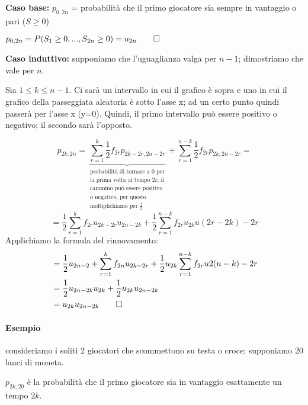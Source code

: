 \documentclass[a4paper,12pt]{book}
\begin{document}
\textbf{Caso base: } $ p_{0,2n} $ = probabilità che il primo giocatore sia sempre in vantaggio o pari ($ S \ge 0 $)

$ p_{0, 2n } = P(S_1 \ge 0, ..., S_{2n} \ge 0) = u_{2n} \qed$

\textbf{Caso induttivo: } supponiamo che l'uguaglianza valga per $ n-1 $; dimostriamo che vale per $ n $. 

Sia $ 1 \le k \le n-1 $. Ci sarà un intervallo in cui il grafico è sopra e uno in cui il grafico della passeggiata aleatoria è sotto l'asse x; ad un certo punto quindi passerà per l'asse x (y=0). Quindi, il primo intervallo può essere positivo o negativo; il secondo sarà l'opposto. 

$$ p_{2k, 2n} = \underbrace{\sum_{r=1}^{k}\frac{1}{2} f_{2r} p_{2k-2r, 2n-2r}}_{\substack{\text{probabilità di tornare a 0 per} \\ \text{la prima volta al tempo 2r; il} \\ \text{cammino può essere positivo} \\ \text{o negativo, per questo} \\ \text{moltiplichiamo per } \frac{1}{2}}}       + \sum_{r=1}^{n-k} \frac{1}{2}f_{2r}p_{2k, 2n-2r} =  $$ 
$$ = \frac{1}{2} \sum_{r=1}^{k} f_{2r}u_{2k-2r}u_{2n-2k} + \frac{1}{2}\sum_{r=1}^{n-k}f_{2r}u_{2k}u(2r-2k) - 2r$$
Applichiamo la formula del rinnovamento:
\begin{align*}
	& = \frac{1}{2}u_{2n-2} + \sum_{r=1}^{k}f_{2n}u_{2k-2r} + \frac{1}{2}u_{2k}\sum_{r=1}^{n-k}f_{2r} u2(n-k) - 2r \\
	& = \frac{1}{2} u_{2n-2k}u_{2k} + \frac{1}{2}u_{2k}u_{2n-2k} \\
	& = u_{2k}u_{2n-2k} \qed 
\end{align*}

\paragraph{Esempio} consideriamo i soliti 2 giocatori che scommettono su testa o croce; supponiamo 20 lanci di moneta. 

$ p_{2k,20} $ è la probabilità che il primo giocatore sia in vantaggio esattamente un tempo $ 2k $.
\end{document}
